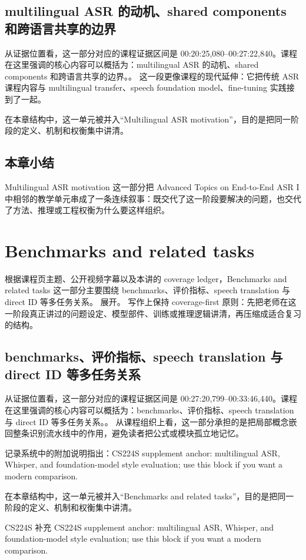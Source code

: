 \documentclass[a4paper]{article}
\begin{document}
\subsection{multilingual ASR 的动机、shared components 和跨语言共享的边界}
从证据位置看，这一部分对应的课程证据区间是 00:20:25,080--00:27:22,840。课程在这里强调的核心内容可以概括为：multilingual ASR 的动机、shared components 和跨语言共享的边界。。
这一段更像课程的现代延伸：它把传统 ASR 课程内容与 multilingual transfer、speech foundation model、fine-tuning 实践接到了一起。

在本章结构中，这一单元被并入“Multilingual ASR motivation”，目的是把同一阶段的定义、机制和权衡集中讲清。

\subsection{本章小结}
Multilingual ASR motivation 这一部分把 Advanced Topics on End-to-End ASR I 中相邻的教学单元串成了一条连续叙事：既交代了这一阶段要解决的问题，也交代了方法、推理或工程权衡为什么要这样组织。

\section{Benchmarks and related tasks}
根据课程页主题、公开视频字幕以及本讲的 coverage ledger，Benchmarks and related tasks 这一部分主要围绕 benchmarks、评价指标、speech translation 与 direct ID 等多任务关系。 展开。
写作上保持 coverage-first 原则：先把老师在这一阶段真正讲过的问题设定、模型部件、训练或推理逻辑讲清，再压缩成适合复习的结构。

\subsection{benchmarks、评价指标、speech translation 与 direct ID 等多任务关系}
从证据位置看，这一部分对应的课程证据区间是 00:27:20,799--00:33:46,440。课程在这里强调的核心内容可以概括为：benchmarks、评价指标、speech translation 与 direct ID 等多任务关系。。
从课程组织上看，这一部分承担的是把局部概念嵌回整条识别流水线中的作用，避免读者把公式或模块孤立地记忆。

记录系统中的附加说明指出：CS224S supplement anchor: multilingual ASR, Whisper, and foundation-model style evaluation; use this block if you want a modern comparison.

在本章结构中，这一单元被并入“Benchmarks and related tasks”，目的是把同一阶段的定义、机制和权衡集中讲清。
\begin{knowledgebox}{CS224S 补充}
CS224S supplement anchor: multilingual ASR, Whisper, and foundation-model style evaluation; use this block if you want a modern comparison.
\end{knowledgebox}
\end{document}
